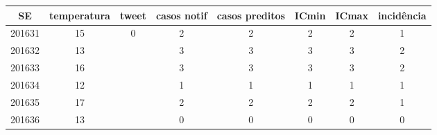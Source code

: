 \begin{tabular}{c|ccccccc}
  \hline
SE & temperatura & tweet & casos notif & casos preditos & ICmin & ICmax & incidência \\ 
  \hline
201631 & 15 & 0 & 2 & 2 & 2 & 2 & 1 \\ 
  201632 & 13 &  & 3 & 3 & 3 & 3 & 2 \\ 
  201633 & 16 &  & 3 & 3 & 3 & 3 & 2 \\ 
  201634 & 12 &  & 1 & 1 & 1 & 1 & 1 \\ 
  201635 & 17 &  & 2 & 2 & 2 & 2 & 1 \\ 
  201636 & 13 &  & 0 & 0 & 0 & 0 & 0 \\ 
   \hline
\end{tabular}
